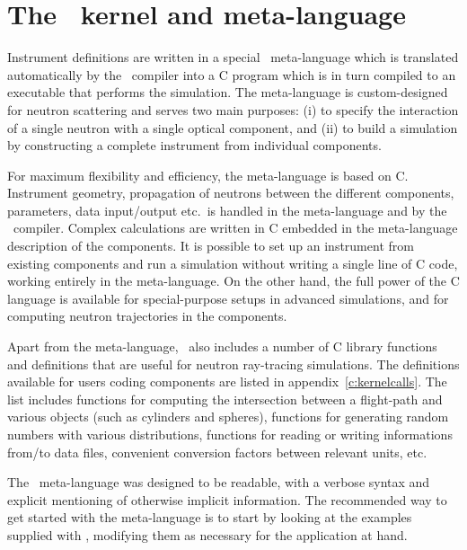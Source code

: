 
\chapter{The \MCS\ kernel and meta-language}
\label{s:kernel}

Instrument definitions are written in a special \MCS\ meta-language which
is translated automatically by the \MCS\ compiler into a C program
which is in turn compiled to an executable that
performs the simulation. The meta-language is custom-designed for neutron
scattering and serves two main purposes: (i) to specify the interaction of a
single neutron with a single optical component, and (ii) to build a
simulation by constructing a complete instrument from individual
components.

For maximum flexibility and efficiency, the meta-language is based on C.
Instrument geometry, propagation of neutrons between the different
components, parameters, data input/output etc.\ is handled in the
meta-language and by the \MCS\ compiler. Complex calculations are written in
C embedded in the meta-language description of the components. It is
possible to set up an instrument from existing components and
run a simulation without writing a single line of C code, working
entirely in the meta-language. On the other hand, the full power of the C
language is available for special-purpose setups in advanced
simulations, and for computing neutron trajectories in the components.

Apart from the meta-language, \MCS\ also includes a number of C library
functions and definitions that are useful for neutron ray-tracing
simulations. The definitions available for users coding components are
listed in appendix~\ref{c:kernelcalls}. The list includes functions for
computing the intersection between a flight-path and various objects
(such as cylinders and spheres), functions for generating random numbers
with various distributions, functions for reading or writing
informations from/to data files, convenient conversion
factors between relevant units, etc. 

The \MCS\ meta-language was designed to be readable, with a verbose
syntax and explicit mentioning of otherwise implicit information. The
recommended way to get started with the meta-language is to start by
looking at the examples supplied with \MCS, modifying them as necessary
for the application at hand.

